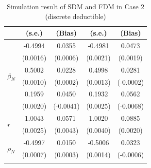 \documentclass[11pt]{article}
\begin{document}
\begin{table}[!ht]
{{\begin{minipage}{0.5\textwidth}
\begin{tabular}{lcccc}
        & (s.e.) & (Bias) & (s.e.) & (Bias) \\
        \midrule
        \multirow{6}{*}{$\beta_N$} & -0.4994 & 0.0355 & -0.4981 & 0.0473 \\
         & (0.0016) & (0.0006) & (0.0021) & (0.0019) \\
        \cmidrule{2-5}
         & 0.5002 & 0.0228 & 0.4998 & 0.0281 \\
         & (0.0010) & (0.0002) & (0.0013) & (-0.0002) \\
        \cmidrule{2-5}
         & 0.1959 & 0.0450 & 0.1932 & 0.0562 \\
         & (0.0020) & (-0.0041) & (0.0025) & (-0.0068) \\
        \midrule
        \multirow{2}{*}{$r$} & 1.0043 & 0.0571 & 1.0020 & 0.0885 \\
         & (0.0025) & (0.0043) & (0.0040) & (0.0020) \\
        \midrule
        \multirow{2}{*}{$\rho_N$} & -0.4997 & 0.0150 & -0.5006 & 0.0323 \\
         & (0.0007) & (0.0003) & (0.0014) & (-0.0006) \\
        \hhline{=====}
        \end{tabular}
    \end{minipage}
}
}
\caption{Simulation result of SDM and FDM in Case 2 (discrete deductible)}\label{tab:AppSimEndCase2}
\end{table}
\end{document}
